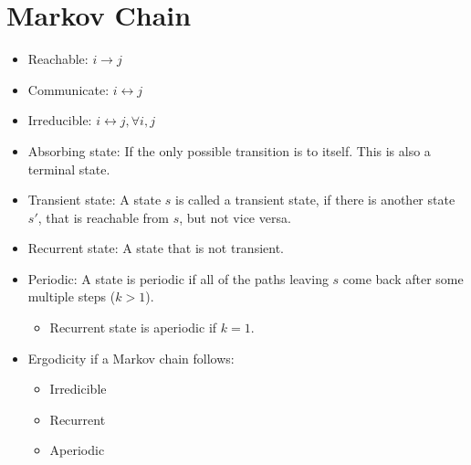 \section{Markov Chain}
\begin{itemize}
	\item Reachable: $i\to j$
	\item Communicate: $i\leftrightarrow j$
	\item Irreducible: $i\leftrightarrow j, \forall i,j$
	\item Absorbing state: If the only possible transition is to itself. This is also a terminal state.
	\item Transient state: A state $s$ is called a transient state, if there is another state $s'$, that is reachable from $s$, but not vice versa. 
	\item Recurrent state: A state that is not transient. 
	\item Periodic: A state is periodic if all of the paths leaving $s$ come back after some multiple steps ($k>1$). 
		\begin{itemize}
			\item Recurrent state is aperiodic if $k=1$.
		\end{itemize}
	\item Ergodicity if a Markov chain follows:
		\begin{itemize}
			\item Irredicible
			\item Recurrent
			\item Aperiodic
		\end{itemize}
\end{itemize}




